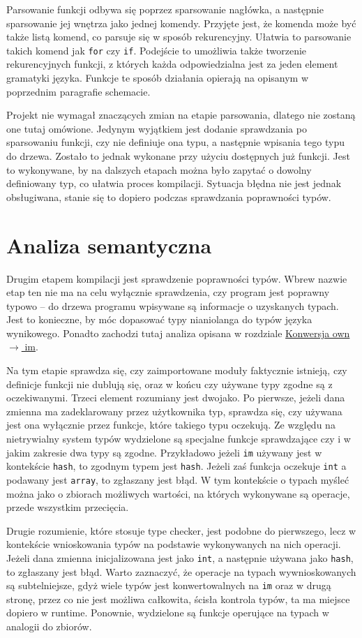 \documentclass[licencjacka]{pracamgr}
\begin{document}
Parsowanie funkcji odbywa się poprzez sparsowanie nagłówka, a następnie sparsowanie jej wnętrza jako jednej komendy. Przyjęte jest, że komenda może być także listą komend, co parsuje się w sposób rekurencyjny. Ułatwia to parsowanie takich komend jak \texttt{for} czy \texttt{if}. Podejście to umożliwia także tworzenie rekurencyjnych funkcji, z których każda odpowiedzialna jest za jeden element gramatyki języka. Funkcje te sposób działania opierają na opisanym w poprzednim paragrafie schemacie.

Projekt nie wymagał znaczących zmian na etapie parsowania, dlatego nie zostaną one tutaj omówione. Jedynym wyjątkiem jest dodanie sprawdzania po sparsowaniu funkcji, czy nie definiuje ona typu, a następnie wpisania tego typu do drzewa. Zostało to jednak wykonane przy użyciu dostępnych już funkcji. Jest to wykonywane, by na dalszych etapach można było zapytać o dowolny definiowany typ, co ułatwia proces kompilacji. Sytuacja błędna nie jest jednak obsługiwana, stanie się to dopiero podczas sprawdzania poprawności typów.
\section{Analiza semantyczna}
Drugim etapem kompilacji jest sprawdzenie poprawności typów. Wbrew nazwie etap ten nie ma na celu wyłącznie sprawdzenia, czy program jest poprawny typowo -- do drzewa programu wpisywane są informacje o uzyskanych typach. Jest to konieczne, by móc dopasować typy nianiolanga do typów języka wynikowego. Ponadto zachodzi tutaj analiza opisana w rozdziale \hyperref[sec:own_to_im]{Konwersja own $\rightarrow$ im}.

Na tym etapie sprawdza się, czy zaimportowane moduły faktycznie istnieją, czy definicje funkcji nie dublują się, oraz w końcu czy używane typy zgodne są z oczekiwanymi. Trzeci element rozumiany jest dwojako. Po pierwsze, jeżeli dana zmienna ma zadeklarowany przez użytkownika typ, sprawdza się, czy używana jest ona wyłącznie przez funkcje, które takiego typu oczekują.  Ze względu na nietrywialny system typów wydzielone są specjalne funkcje sprawdzające czy i w jakim zakresie dwa typy są zgodne. Przykładowo jeżeli \texttt{im} używany jest w kontekście \texttt{hash}, to zgodnym typem jest \texttt{hash}. Jeżeli zaś funkcja oczekuje \texttt{int} a podawany jest \texttt{array}, to zgłaszany jest błąd. W tym kontekście o typach myśleć można jako o zbiorach możliwych wartości, na których wykonywane są operacje, przede wszystkim przecięcia.

Drugie rozumienie, które stosuje type checker, jest podobne do pierwszego, lecz w kontekście wnioskowania typów na podstawie wykonywanych na nich operacji. Jeżeli dana zmienna inicjalizowana jest jako \texttt{int}, a następnie używana jako \texttt{hash}, to zgłaszany jest błąd. Warto zaznaczyć, że operacje na typach wywnioskowanych są subtelniejsze, gdyż wiele typów jest konwertowalnych na \texttt{im} oraz w drugą stronę, przez co nie jest możliwa całkowita, ścisła kontrola typów, ta ma miejsce dopiero w runtime. Ponownie, wydzielone są funkcje operujące na typach w analogii do zbiorów.
\end{document}

